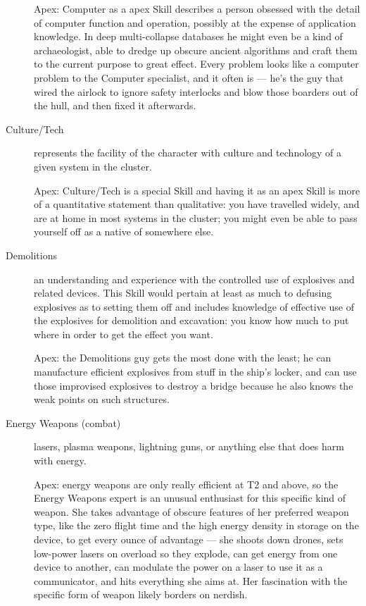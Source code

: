 \begin{description}
Apex: Computer as a apex Skill describes a person obsessed with the detail of computer function and operation, possibly at the expense of application knowledge. In deep multi-collapse databases he might even be a kind of archaeologist, able to dredge up obscure ancient algorithms and craft them to the current purpose to great effect. Every problem looks like a computer problem to the Computer specialist, and it often is --- he's the guy that wired the airlock to ignore safety interlocks and blow those boarders out of the hull, and then fixed it afterwards.

\item[Culture/Tech]
represents the facility of the character with culture and technology of a given system in the cluster.

Apex: Culture/Tech is a special Skill and having it as an apex Skill is more of a quantitative statement than qualitative: you have travelled widely, and are at home in most systems in the cluster; you might even be able to pass yourself off as a native of somewhere else.

\item[Demolitions]
an understanding and experience with the controlled use of explosives and related devices. This Skill would pertain at least as much to defusing explosives as to setting them off and includes knowledge of effective use of the explosives for demolition and excavation: you know how much to put where in order to get the effect you want.

Apex: the Demolitions guy gets the most done with the least; he can manufacture efficient explosives from stuff in the ship's locker, and can use those improvised explosives to destroy a bridge because he also knows the weak points on such structures.

\item[Energy Weapons (combat)]
lasers, plasma weapons, lightning guns, or anything else that does harm with energy.

Apex: energy weapons are only really efficient at T2 and above, so the Energy Weapons expert is an unusual enthusiast for this specific kind of weapon. She takes advantage of obscure features of her preferred weapon type, like the zero flight time and the high energy density in storage on the device, to get every ounce of advantage --- she shoots down drones, sets low-power lasers on overload so they explode, can get energy from one device to another, can modulate the power on a laser to use it as a communicator, and hits everything she aims at. Her fascination with the specific form of weapon likely borders on nerdish.


\end{description}
